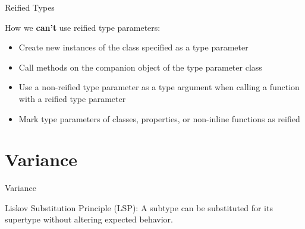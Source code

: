 \documentclass[xcolor=pdftex,dvipsnames,table]{beamer}
\newenvironment{bgverbatim}[1]{
  \vspace{5pt}#1\VerbatimEnvironment
  \begin{tcolorbox}[breakable,spartan]%
  \begin{Verbatim}[commandchars=&\[\]]}
  {\end{Verbatim}\end{tcolorbox}}
\newenvironment{wideitemize}{\itemize\addtolength{\itemsep}{5pt}}{\enditemize}
\begin{document}

\begin{frame}[fragile]{Reified Types}
  \begin{wideitemize}
    \item How we \textbf{can't} use reified type parameters:
    \begin{itemize}
      \item Create new instances of the class specified as a type parameter
      \item Call methods on the companion object of the type parameter class
      \item Use a non-reified type parameter as a type argument when calling a function with a reified type parameter
      \item Mark type parameters of classes, properties, or non-inline functions as reified
    \end{itemize}
  \end{wideitemize}
\end{frame}

\section{Variance}

\begin{frame}{Variance}
  \begin{wideitemize}
    \item Liskov Substitution Principle (LSP): A subtype can be substituted for its supertype without altering expected behavior.
  \end{wideitemize}
\end{frame}
\end{document}
